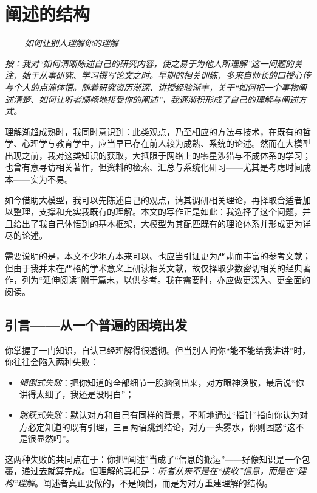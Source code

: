 \chapter{阐述的结构}
\begin{flushright}
    —— \textit{如何让别人理解你的理解}
\end{flushright}

{\itshape    
    按：我对“如何清晰陈述自己的研究内容，使之易于为他人所理解”这一问题的关注，始于从事研究、学习撰写论文之时。早期的相关训练，多来自师长的口授心传与个人的点滴体悟。随着研究资历渐深、讲授经验渐丰，关于“如何把一个事物阐述清楚、如何让听者顺畅地接受你的阐述”，我逐渐积形成了自己的理解与阐述方式。
    
    理解渐趋成熟时，我同时意识到：此类观点，乃至相应的方法与技术，在既有的哲学、心理学与教育学中，应当早已存在前人较为成熟、系统的论述。然而在大模型出现之前，我对这类知识的获取，大抵限于网络上的零星涉猎与不成体系的学习；也曾有意寻访相关著作，但资料的检索、汇总与系统化研习——尤其是考虑时间成本——实为不易。
    
    如今借助大模型，我可以先陈述自己的观点，请其调研相关理论，再择取合适者加以整理，支撑和充实我既有的理解。本文的写作正是如此：我选择了这个问题，并且给出了我自己体悟到的基本框架，大模型为其配匹既有的理论体系并形成更为详尽的论述。
    
    需要说明的是，本文不少地方本来可以、也应当引证更为严肃而丰富的参考文献；但由于我并未在严格的学术意义上研读相关文献，故仅择取少数密切相关的经典著作，列为“延伸阅读”附于篇末，以供参考。我在需要时，亦应做更深入、更全面的阅读。
}

\section{引言——从一个普遍的困境出发}

你掌握了一门知识，自认已经理解得很透彻。但当别人问你“能不能给我讲讲”时，你往往会陷入两种失败：
\begin{itemize}
    \item \textit{倾倒式失败}：把你知道的全部细节一股脑倒出来，对方眼神涣散，最后说“你讲得太细了，我还是没明白”；
    \item \textit{跳跃式失败}：默认对方和自己有同样的背景，不断地通过“指针”指向你认为对方必定知道的既有引理，三言两语跳到结论，对方一头雾水，你则困惑“这不是很显然吗”。
\end{itemize}

这两种失败的共同点在于：你把“阐述”当成了“信息的搬运”——好像知识是一个包裹，递过去就算完成。但理解的真相是：\textit{听者从来不是在“接收”信息，而是在“建构”理解}。阐述者真正要做的，不是倾倒，而是为对方重建理解的结构。

